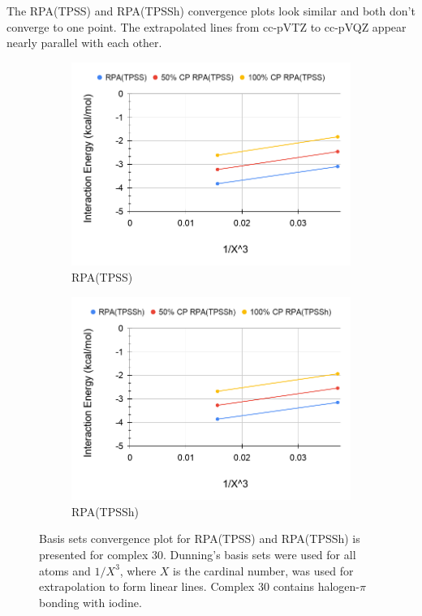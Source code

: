 \documentclass[11pt]{article}
\begin{document}
The RPA(TPSS) and RPA(TPSSh) convergence plots look similar and both don't
converge to one point. The extrapolated lines from cc-pVTZ to cc-pVQZ
appear nearly parallel with each other.

\begin{figure}[H]
  \centering
  \begin{subfigure}{.5\textwidth}
    \centering
    \includegraphics[scale=0.3]{tpss-30.png}
    \caption{RPA(TPSS)}
    \label{fig:tpss_30}
  \end{subfigure}%
  \begin{subfigure}{.5\textwidth}
    \centering
    \includegraphics[scale=0.3]{tpssh-30.png}
    \caption{RPA(TPSSh)}
    \label{fig:tpssh_30}
  \end{subfigure}
  \caption{Basis sets convergence plot for RPA(TPSS) and RPA(TPSSh) is
    presented for complex 30. Dunning's basis sets were used for all
    atoms and $1/X^3$, where $X$ is the cardinal number, was used for
    extrapolation to form linear lines. Complex 30 contains halogen-$\pi$
    bonding with iodine.}
  \label{fig:complex_30}
\end{figure}
\end{document}
